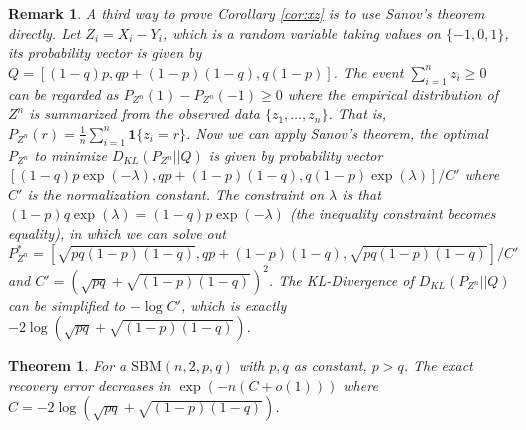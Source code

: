 \documentclass{article}
\newtheorem{theorem}{Theorem}
\newtheorem{remark}{Remark}
\begin{document}
\begin{remark}
	A third way to prove Corollary \ref{cor:xz} is to use Sanov's theorem directly. Let $Z_i = X_i - Y_i$, which is a random variable
	taking values on $\{-1, 0, 1\}$, its probability vector is given by $Q=[(1-q)p, qp+(1-p)(1-q), q(1-p)]$.
	The event $\sum_{i=1}^n z_i \geq 0 $ can be regarded as $P_{Z^n}(1) - P_{Z^n}(-1) \geq 0$ where the empirical distribution
	of $Z^n$ is summarized from the observed data $\{z_1, \dots, z_n\}$. That is, $P_{Z^n}(r) = \frac{1}{n}\sum_{i=1}^n \bm{1}\{z_i = r\}$.
	Now we can apply Sanov's theorem, the optimal $P_{Z^n}$ to minimize $D_{KL}(P_{Z^n}|| Q)$ is given by
	probability vector $[(1-q)p\exp(-\lambda), qp+(1-p)(1-q), q(1-p)\exp(\lambda)]/C'$ where $C'$ is the normalization constant. The constraint on
	$\lambda$ is that $(1-p)q\exp(\lambda)=(1-q)p\exp(-\lambda)$ (the inequality constraint becomes equality), in which we can solve out
	$P^*_{Z^n} = [\sqrt{pq(1-p)(1-q)}, qp+(1-p)(1-q), \sqrt{pq(1-p)(1-q)}]/C'$ and $C'=(\sqrt{pq}+\sqrt{(1-p)(1-q)})^2$.
	The KL-Divergence of $D_{KL}(P_{Z^n}|| Q)$ can be simplified to $-\log C'$, which is exactly $-2\log (\sqrt{pq}+\sqrt{(1-p)(1-q)})$.
\end{remark}
\begin{theorem}\label{thm:2pq}
	For a $\textrm{SBM}(n,2,p, q)$ with $p,q$ as constant, $p > q$. The
	exact recovery error decreases in $\exp(-n (C + o(1)))$
	where $C = -2\log(\sqrt{pq} + \sqrt{(1-p)(1-q)})$.
\end{theorem}
\end{document}
